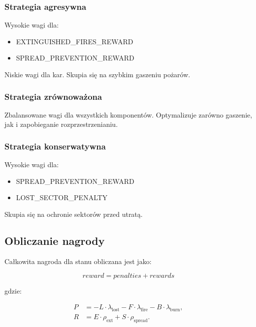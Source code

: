 \documentclass[11pt,a4paper]{article}
\begin{document}
\subsubsection{Strategia agresywna}

Wysokie wagi dla:
\begin{itemize}
    \item EXTINGUISHED\_FIRES\_REWARD
    \item SPREAD\_PREVENTION\_REWARD
\end{itemize}

Niskie wagi dla kar. Skupia się na szybkim gaszeniu pożarów.

\subsubsection{Strategia zrównoważona}

Zbalansowane wagi dla wszystkich komponentów. Optymalizuje zarówno gaszenie, jak i zapobieganie rozprzestrzenianiu.

\subsubsection{Strategia konserwatywna}

Wysokie wagi dla:
\begin{itemize}
    \item SPREAD\_PREVENTION\_REWARD
    \item LOST\_SECTOR\_PENALTY
\end{itemize}

Skupia się na ochronie sektorów przed utratą.

\subsection{Obliczanie nagrody}

Całkowita nagroda dla stanu obliczana jest jako:

\begin{equation}
reward = penalties + rewards
\end{equation}

gdzie:

\begin{align}
P &=
- L \cdot \lambda_{\text{lost}}
- F \cdot \lambda_{\text{fire}}
- B \cdot \lambda_{\text{burn}}, \\[0.5em]
R &=
E \cdot \rho_{\text{ext}}
+ S \cdot \rho_{\text{spread}}.
\end{align}
\end{document}
